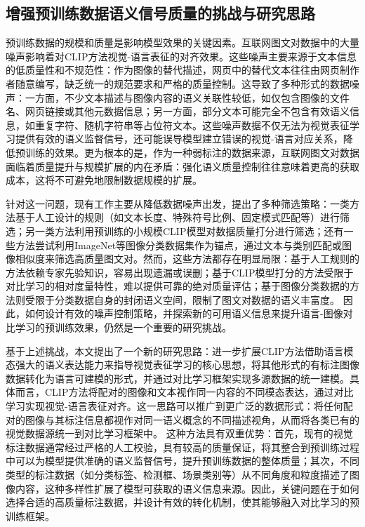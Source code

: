 \subsection{增强预训练数据语义信号质量的挑战与研究思路}
预训练数据的规模和质量是影响模型效果的关键因素。互联网图文对数据中的大量噪声影响着对CLIP方法视觉-语言表征的对齐效果。这些噪声主要来源于文本信息的低质量性和不规范性：作为图像的替代描述，网页中的替代文本往往由网页制作者随意编写，缺乏统一的规范要求和严格的质量控制。这导致了多种形式的数据噪声：一方面，不少文本描述与图像内容的语义关联性较低，如仅包含图像的文件名、网页链接或其他元数据信息；另一方面，部分文本可能完全不包含有效语义信息，如重复字符、随机字符串等占位符文本。这些噪声数据不仅无法为视觉表征学习提供有效的语义监督信号，还可能误导模型建立错误的视觉-语言对应关系，降低预训练的效果。更为根本的是，作为一种弱标注的数据来源，互联网图文对数据面临着质量提升与规模扩展的内在矛盾：强化语义质量控制往往意味着更高的获取成本，这将不可避免地限制数据规模的扩展。

针对这一问题，现有工作主要从降低数据噪声出发，提出了多种筛选策略：一类方法基于人工设计的规则（如文本长度、特殊符号比例、固定模式匹配等）进行筛选；另一类方法利用预训练的小规模CLIP模型对数据质量打分进行筛选；还有一些方法尝试利用ImageNet等图像分类数据集作为锚点，通过文本与类别匹配或图像相似度来筛选高质量图文对。然而，这些方法都存在明显局限：基于人工规则的方法依赖专家先验知识，容易出现遗漏或误删；基于CLIP模型打分的方法受限于对比学习的相对度量特性，难以提供可靠的绝对质量评估；基于图像分类数据的方法则受限于分类数据自身的封闭语义空间，限制了图文对数据的语义丰富度。
因此，如何设计有效的噪声控制策略，并探索新的可用语义信息来提升语言-图像对比学习的预训练效果，仍然是一个重要的研究挑战。

基于上述挑战，本文提出了一个新的研究思路：进一步扩展CLIP方法借助语言模态强大的语义表达能力来指导视觉表征学习的核心思想，将其他形式的有标注图像数据转化为语言可建模的形式，并通过对比学习框架实现多源数据的统一建模。具体而言，CLIP方法将配对的图像和文本视作同一内容的不同模态表达，通过对比学习实现视觉-语言表征对齐。这一思路可以推广到更广泛的数据形式：将任何配对的图像与其标注信息都视作对同一语义概念的不同描述视角，从而将各类已有的视觉数据源统一到对比学习框架中。
这种方法具有双重优势：首先，现有的视觉标注数据通常经过严格的人工校验，具有较高的质量保证，将其整合到预训练过程中可以为模型提供准确的语义监督信号，提升预训练数据的整体质量；其次，不同类型的标注数据（如分类标签、检测框、场景类别等）从不同角度和粒度描述了图像内容，这种多样性扩展了模型可获取的语义信息来源。因此，关键问题在于如何选择合适的高质量标注数据，并设计有效的转化机制，使其能够融入对比学习的预训练框架。

